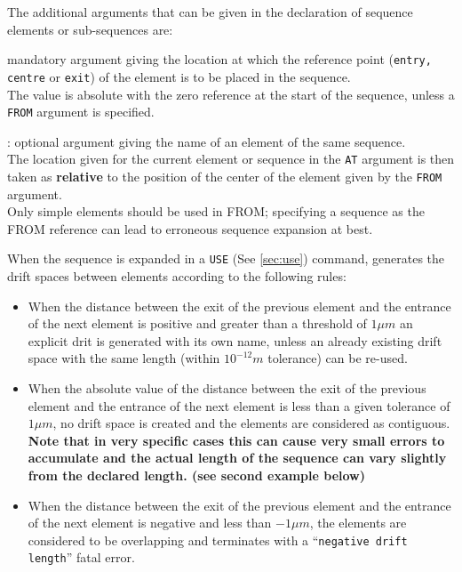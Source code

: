 The additional arguments that can be given in the declaration of sequence 
elements or sub-sequences are: 
\begin{madlist}
   mandatory argument giving the location at
  which the reference point (\texttt{entry, centre} or \texttt{exit}) of
  the element is to be placed in the sequence. \\  
  The value is absolute with the zero reference at the start of the
  sequence, unless a {\tt FROM} argument is specified. 

  : optional argument giving the name of an
  element of the same sequence. \\  
  The location given for the current element or sequence in the {\tt AT}
  argument is then taken as {\bf relative}  to the position of the
  center of the element given by the {\tt FROM} argument. \\
  Only simple elements should be used in FROM; specifying a sequence 
  as the FROM reference can lead to erroneous sequence expansion at best.  
\end{madlist}


When the sequence is expanded in a \texttt{USE} (See \ref{sec:use})
command, \madx generates the drift spaces between elements according to
the following rules: 
\begin{itemize}
\item When the distance between the exit of the previous element and the
  entrance of the next element is positive and greater than a threshold
  of $1 \mu m$ an explicit drit is generated with its own name, unless
  an already existing drift space with the same length (within $10^{-12}
  m$ tolerance) can be re-used.
\item When the absolute value of the distance between the exit of the 
  previous element and the entrance of the next element is less than a
  given tolerance of $1\mu m$, no drift space is created and the
  elements are considered as contiguous. \\
  {\bf Note that in very specific cases this can cause very small errors
    to accumulate and the actual length of the sequence can vary
    slightly from the declared length. (see second example below)} 
\item When the distance between the exit of the previous element and the 
  entrance of the next element is negative and less than $-1\mu m$,
  the elements are considered to be overlapping and \madx terminates
  with a ``{\tt negative drift length}'' fatal error. 
\end{itemize} 



